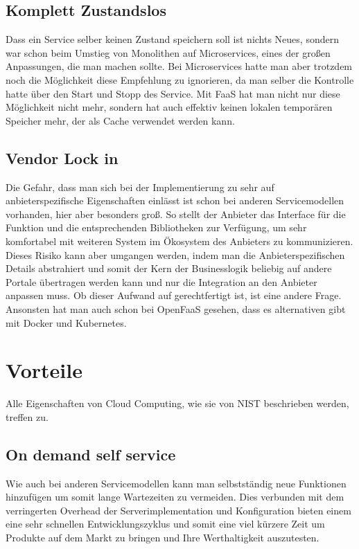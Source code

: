 \documentclass[12pt, a4paper]{article}
\begin{document}
\subsection{Komplett Zustandslos}
Dass ein Service selber keinen Zustand speichern soll ist nichts Neues, sondern war schon beim Umstieg von Monolithen auf Microservices, eines der großen Anpassungen, die man machen sollte.
Bei Microservices hatte man aber trotzdem noch die Möglichkeit diese Empfehlung zu ignorieren, da man selber die Kontrolle hatte über den Start und Stopp des Service.
Mit \ac{FaaS} hat man nicht nur diese Möglichkeit nicht mehr, sondern hat auch effektiv keinen lokalen temporären Speicher mehr, der als Cache verwendet werden kann.

\subsection{Vendor Lock in}
Die Gefahr, dass man sich bei der Implementierung zu sehr auf anbieterspezifische Eigenschaften einlässt ist schon bei anderen Servicemodellen vorhanden, hier aber besonders groß.
So stellt der Anbieter das Interface für die Funktion und die entsprechenden Bibliotheken zur Verfügung, um sehr komfortabel mit weiteren System im Ökosystem des Anbieters zu kommunizieren.
Dieses Risiko kann aber umgangen werden, indem man die Anbieterspezifischen Details abstrahiert und somit der Kern der Businesslogik beliebig auf andere Portale übertragen werden kann und nur die Integration an den Anbieter anpassen muss.
Ob dieser Aufwand auf gerechtfertigt ist, ist eine andere Frage.
Ansonsten hat man auch schon bei OpenFaaS gesehen, dass es alternativen gibt mit Docker und Kubernetes.

\section{Vorteile}
Alle Eigenschaften von Cloud Computing, wie sie von \ac{NIST} beschrieben werden, treffen zu\cite{mell2011nist}.
\subsection{On demand self service}
Wie auch bei anderen Servicemodellen kann man selbstständig neue Funktionen hinzufügen um somit lange Wartezeiten zu vermeiden.
Dies verbunden mit dem verringerten Overhead der Serverimplementation und Konfiguration bieten einem eine sehr schnellen Entwicklungszyklus und somit eine viel kürzere Zeit um Produkte auf dem Markt zu bringen und Ihre Werthaltigkeit auszutesten.
\end{document}
